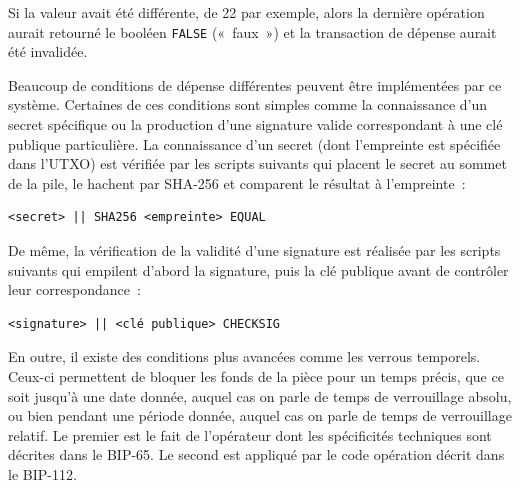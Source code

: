 Si la valeur avait été différente, de 22 par exemple, alors la dernière opération aurait retourné le booléen \texttt{FALSE} («~faux~») et la transaction de dépense aurait été invalidée.


Beaucoup de conditions de dépense différentes peuvent être implémentées par ce système. Certaines de ces conditions sont simples comme la connaissance d'un secret spécifique ou la production d'une signature valide correspondant à une clé publique particulière. La connaissance d'un secret (dont l'empreinte est spécifiée dans l'UTXO) est vérifiée par les scripts suivants qui placent le secret au sommet de la pile, le hachent par SHA-256 et comparent le résultat à l'empreinte~:

\begin{Verbatim}[fontsize=\footnotesize]
<secret> || SHA256 <empreinte> EQUAL
\end{Verbatim}

De même, la vérification de la validité d'une signature est réalisée par les scripts suivants qui empilent d'abord la signature, puis la clé publique avant de contrôler leur correspondance~:

\begin{Verbatim}[fontsize=\footnotesize]
<signature> || <clé publique> CHECKSIG
\end{Verbatim}

En outre, il existe des conditions plus avancées comme les verrous temporels. Ceux-ci permettent de bloquer les fonds de la pièce pour un temps précis, que ce soit jusqu'à une date donnée, auquel cas on parle de temps de verrouillage absolu, ou bien pendant une période donnée, auquel cas on parle de temps de verrouillage relatif. Le premier est le fait de l'opérateur  dont les spécificités techniques sont décrites dans le BIP-65. Le second est appliqué par le code opération  décrit dans le BIP-112.

